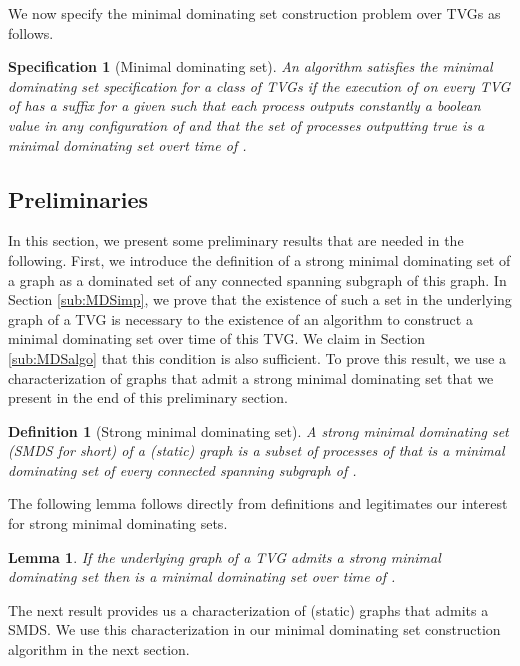 \documentclass{article}
\newtheorem{definition}{Definition}
\newtheorem{lemma}{Lemma}
\newtheorem{specification}{Specification}
\begin{document}
We now specify the minimal dominating set construction problem over TVGs as follows.

\begin{specification}[Minimal dominating set]
An algorithm  satisfies the minimal dominating set specification for a class of TVGs  if the execution  of  on every TVG  of  has a suffix  for a given  such that each process outputs constantly a boolean value in any configuration of  and that the set of processes outputting true is a minimal dominating set overt time of .
\end{specification}

\subsection{Preliminaries}\label{sub:MDSprelem}

In this section, we present some preliminary results that are needed in the following. First, we introduce the definition of a strong minimal dominating set of a graph as a dominated set of any connected spanning subgraph of this graph. In Section \ref{sub:MDSimp}, we prove that the existence of such a set in the underlying graph of a TVG is necessary to the existence of an algorithm to construct a minimal dominating set over time of this TVG. We claim in Section \ref{sub:MDSalgo} that this condition is also sufficient. To prove this result, we use a characterization of graphs that admit a strong minimal dominating set that we present in the end of this preliminary section.
 
\begin{definition}[Strong minimal dominating set] 
A strong minimal dominating set (SMDS for short) of a (static) graph  is a subset of processes of  that is a minimal dominating set of every connected spanning subgraph of .
\end{definition}

The following lemma follows directly from definitions and legitimates our interest for strong minimal dominating sets.

\begin{lemma}\label{lem:smdsismdst}
If the underlying graph of a TVG  admits a strong minimal dominating set  then  is a minimal dominating set over time of .
\end{lemma}

The next result provides us a characterization of (static) graphs that admits a SMDS. We use this characterization in our minimal dominating set construction algorithm in the next section.
\end{document}
